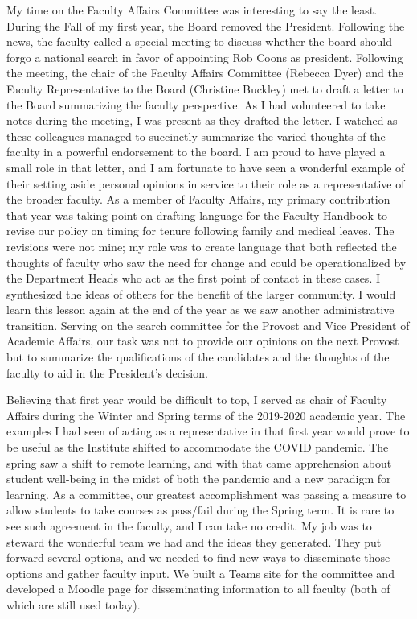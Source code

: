 \documentclass[
  letterpaper,
  DIV=11,
  numbers=noendperiod]{scrreprt}
\begin{document}
My time on the Faculty Affairs Committee was interesting to say the
least. During the Fall of my first year, the Board removed the
President. Following the news, the faculty called a special meeting to
discuss whether the board should forgo a national search in favor of
appointing Rob Coons as president. Following the meeting, the chair of
the Faculty Affairs Committee (Rebecca Dyer) and the Faculty
Representative to the Board (Christine Buckley) met to draft a letter to
the Board summarizing the faculty perspective. As I had volunteered to
take notes during the meeting, I was present as they drafted the letter.
I watched as these colleagues managed to succinctly summarize the varied
thoughts of the faculty in a powerful endorsement to the board. I am
proud to have played a small role in that letter, and I am fortunate to
have seen a wonderful example of their setting aside personal opinions
in service to their role as a representative of the broader faculty. As
a member of Faculty Affairs, my primary contribution that year was
taking point on drafting language for the Faculty Handbook to revise our
policy on timing for tenure following family and medical leaves. The
revisions were not mine; my role was to create language that both
reflected the thoughts of faculty who saw the need for change and could
be operationalized by the Department Heads who act as the first point of
contact in these cases. I synthesized the ideas of others for the
benefit of the larger community. I would learn this lesson again at the
end of the year as we saw another administrative transition. Serving on
the search committee for the Provost and Vice President of Academic
Affairs, our task was not to provide our opinions on the next Provost
but to summarize the qualifications of the candidates and the thoughts
of the faculty to aid in the President's decision.

Believing that first year would be difficult to top, I served as chair
of Faculty Affairs during the Winter and Spring terms of the 2019-2020
academic year. The examples I had seen of acting as a representative in
that first year would prove to be useful as the Institute shifted to
accommodate the COVID pandemic. The spring saw a shift to remote
learning, and with that came apprehension about student well-being in
the midst of both the pandemic and a new paradigm for learning. As a
committee, our greatest accomplishment was passing a measure to allow
students to take courses as pass/fail during the Spring term. It is rare
to see such agreement in the faculty, and I can take no credit. My job
was to steward the wonderful team we had and the ideas they generated.
They put forward several options, and we needed to find new ways to
disseminate those options and gather faculty input. We built a Teams
site for the committee and developed a Moodle page for disseminating
information to all faculty (both of which are still used today).
\end{document}
